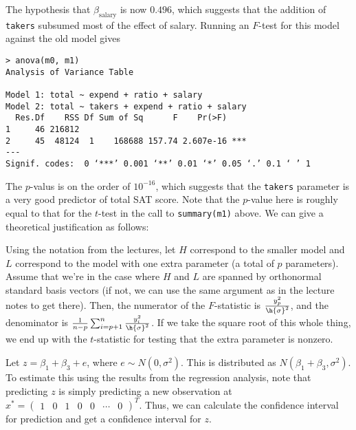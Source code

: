 \documentclass{article}
\newcommand{\openm}{\begin{pmatrix}}
\newcommand{\closem}{\end{pmatrix}}
\begin{document}
The hypothesis that $\beta_\text{salary}$ is now $0.496$, which suggests that the addition of \verb|takers| subsumed most of the effect of salary. Running an $F$-test for this model against the old model gives
\begin{verbatim}
> anova(m0, m1)
Analysis of Variance Table

Model 1: total ~ expend + ratio + salary
Model 2: total ~ takers + expend + ratio + salary
  Res.Df    RSS Df Sum of Sq      F    Pr(>F)    
1     46 216812                                  
2     45  48124  1    168688 157.74 2.607e-16 ***
---
Signif. codes:  0 ‘***’ 0.001 ‘**’ 0.01 ‘*’ 0.05 ‘.’ 0.1 ‘ ’ 1
\end{verbatim}

The $p$-valus is on the order of $10^{-16}$, which suggests that the \verb|takers| parameter is a very good predictor of total SAT score. Note that the $p$-value here is roughly equal to that for the $t$-test in the call to \verb|summary(m1)| above. We can give a theoretical justification as follows: 

Using the notation from the lectures, let $H$ correspond to the smaller model and $L$ correspond to the model with one extra parameter (a total of $p$ parameters). Assume that we're in the case where $H$ and $L$ are spanned by orthonormal standard basis vectors (if not, we can use the same argument as in the lecture notes to get there). Then, the numerator of the $F$-statistic is $\frac{y_{p}^2}{\h{\sigma}^2}$, and the denominator is $\frac{1}{n-p}\sum_{i=p+1}^n\frac{y_i^2}{\h{\sigma}^2}$. If we take the square root of this whole thing, we end up with the $t$-statistic for testing that the extra parameter is nonzero. 

Let $z=\beta_1+\beta_3+e$, where $e\sim N(0,\sigma^2)$. This is distributed as $N(\beta_1+\beta_3,\sigma^2)$. To estimate this using the results from the regression analysis, note that predicting $z$ is simply predicting a new observation at $x^*=\openm1&0&1&0&0&\cdots&0\closem^T$. Thus, we can calculate the confidence interval for prediction and get a confidence interval for $z$.
\end{document}

